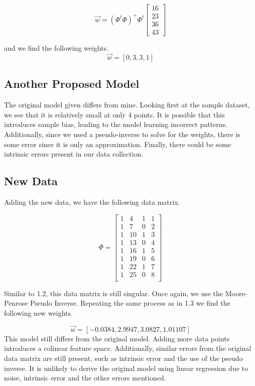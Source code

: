 \documentclass{article}
\begin{document}
\[
\Vec{w} = (\Phi^t \Phi)^+  \Phi^t 
\begin{bmatrix}
16\\
23\\
36\\
43
\end{bmatrix}
\]

\noindent
and we find the following weights.
\noindent
\[
\Vec{w} = [0, 3, 3, 1]
\]

\subsection{Another Proposed Model}

The original model given differs from mine. Looking first at the sample dataset, we see that it is relatively small at only 4 points. It is possible that this introduces sample bias, leading to the model learning incorrect patterns. Additionally, since we used a pseudo-inverse to solve for the weights, there is some error since it is only an approximation. Finally, there could be some intrinsic errors present in our data collection. 

\subsection{New Data}
Adding the new data, we have the following data matrix.

\[
\Phi = \begin{bmatrix}
1 & 4 & 1 & 1\\
1 & 7 & 0 & 2\\
1 & 10 & 1 & 3\\
1 & 13 & 0 & 4\\
1 & 16 & 1 & 5\\
1 & 19 & 0 & 6\\
1 & 22 & 1 & 7\\
1 & 25 & 0 & 8\\
\end{bmatrix}
\]

\noindent
Similar to 1.2, this data matrix is still singular. Once again, we use the Moore-Penrose Pseudo Inverse. Repeating the same process as in 1.3 we find the following new weights. 

\[
\Vec{w} = [-0.0384, 2.9947, 3.0827, 1.01107]
\]
\noindent
This model still differs from the original model. Adding more data points introduces a colinear feature space. Additionally, similar errors from the original data matrix are still present, such as intrinsic error and the use of the pseudo inverse. It is unlikely to derive the original model using linear regression due to noise, intrinsic error and the other errors mentioned.
\end{document}

